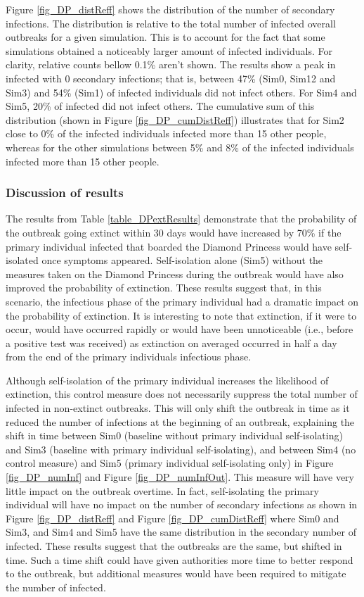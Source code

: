 \documentclass[sr]{drdc-report}
\begin{document}
Figure \ref{fig_DP_distReff}  shows the distribution of the number of secondary infections. The distribution is relative to the total number of infected overall outbreaks for a given simulation. This is to account for the fact that some simulations obtained a noticeably larger amount of infected individuals. For clarity, relative counts bellow 0.1\% aren't shown. The results show a peak in infected with 0 secondary infections; that is, between 47\% (Sim0, Sim12 and Sim3) and 54\% (Sim1) of infected individuals did not infect others. For Sim4 and Sim5, 20\% of infected did not infect others. The cumulative sum of this distribution (shown in Figure \ref{fig_DP_cumDistReff}) illustrates that for Sim2 close to 0\% of the infected individuals infected more than 15 other people, whereas for the other simulations between 5\% and 8\% of the infected individuals infected more than 15 other people. 


\subsubsection{Discussion of results}

The results from Table \ref{table_DPextResults} demonstrate that the probability of the outbreak going extinct within 30 days would have increased by 70\% if the primary individual infected that boarded the Diamond Princess would have self-isolated once symptoms appeared. Self-isolation alone (Sim5) without the measures taken on the Diamond Princess during the outbreak would have also improved the probability of extinction. These results suggest that, in this scenario, the infectious phase of the primary individual had a dramatic impact on the probability of extinction. It is interesting to note that extinction, if it were to occur, would have occurred rapidly or would have been unnoticeable (i.e., before a positive test was received) as extinction on averaged occurred in half a day from the end of the primary individuals infectious phase.

Although self-isolation of the primary individual increases the likelihood of extinction, this control measure does not necessarily suppress the total number of infected in non-extinct outbreaks. This will only shift the outbreak in time as it reduced the number of infections at the beginning of an outbreak, explaining the shift in time between Sim0 (baseline without primary individual self-isolating) and Sim3 (baseline with primary individual self-isolating), and between Sim4 (no control measure) and Sim5 (primary individual self-isolating only) in Figure \ref{fig_DP_numInf} and Figure \ref{fig_DP_numInfOut}. This measure will have very little impact on the outbreak overtime. In fact, self-isolating the primary individual will have no impact on the number of secondary infections as shown in Figure \ref{fig_DP_distReff} and Figure \ref{fig_DP_cumDistReff} where Sim0 and Sim3, and Sim4 and Sim5 have the same distribution in the secondary number of infected. These results suggest that the outbreaks are the same, but shifted in time. Such a time shift could have given authorities more time to better respond to the outbreak, but additional measures would have been required to mitigate the number of infected. 
\end{document}
